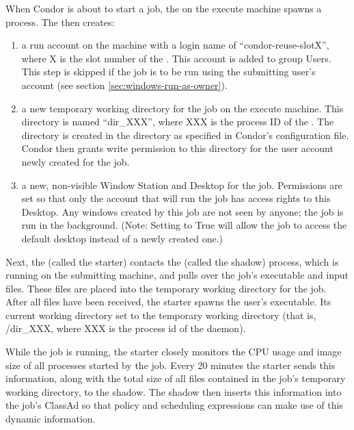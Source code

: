 When Condor is about to start a job, the  on the execute
machine spawns a  process.  The  then
creates:
\begin{enumerate}

\item a run account on the machine with a login name of
``condor-reuse-slotX'', where X is the slot number of the
.  This account is added to group Users.  This step is
skipped if the job is to be run using the submitting user's account
(see section \ref{sec:windows-run-as-owner}).

\item a new temporary working directory for the job on the execute machine.
This directory is
named ``dir\_XXX'', where XXX is the process ID of the .
The directory is created in the  directory as
specified in Condor's configuration file.  Condor then grants write
permission to this directory for the user account newly created for the
job.

\item a new, non-visible Window Station and Desktop for the job.
Permissions are set so that only the account that will run the job has
access rights to this Desktop.  Any windows created by this job are
not seen by anyone; the job is run in the background.  (Note: Setting
 to True will allow the job to access the
default desktop instead of a newly created one.)

\end{enumerate}

Next, the  (called the starter) contacts the
 (called the shadow) process, which is running on the
submitting machine, and pulls over the job's executable and input
files.  These files are placed into the temporary working directory
for the job.  After all files have been received, the starter spawns
the user's executable.  Its current working directory set to the
temporary working directory (that is, /dir\_XXX,
where XXX is the process id of the  daemon).

While the job is running, the starter closely monitors the CPU
usage and image size of all processes started by the job.
Every 20 minutes the starter sends this information,
along with the total size of all files contained in the job's
temporary working directory, to the shadow.
The shadow then
inserts this information into the job's ClassAd so that policy and
scheduling expressions can make use of this dynamic information.

